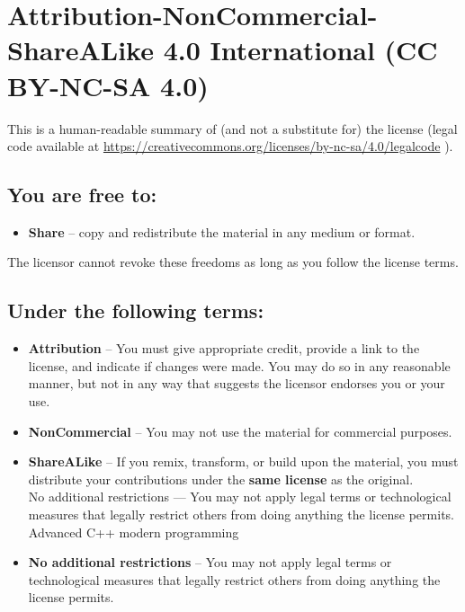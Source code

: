 \chapter*{Attribution-NonCommercial-ShareALike 4.0 International (CC BY-NC-SA 4.0)}

This is a human-readable summary of (and not a substitute for) the license
(legal code available at 
\url{https://creativecommons.org/licenses/by-nc-sa/4.0/legalcode}
).

\section*{You are free to:}

\begin{itemize}

\item \textbf{Share} --
copy and redistribute the material in any medium or format.

\end{itemize}

The licensor cannot revoke these freedoms as long as you follow the license terms.

\section*{Under the following terms:}

\begin{itemize}

\item \textbf{Attribution} --
You must give appropriate credit, provide a link to the license, and indicate
if changes were made. You may do so in any reasonable manner, but not in any
way that suggests the licensor endorses you or your use.

\item \textbf{NonCommercial} --
You may not use the material for commercial purposes.

\item \textbf{ShareALike} --
If you remix, transform, or build upon the material, 
you must distribute your contributions under the \textbf{same license}
 as the original.\\

No additional restrictions — You may not apply legal terms or technological measures that legally restrict others from doing anything the license permits. 
Advanced C++ modern programming

\item \textbf{No additional restrictions} --
You may not apply legal terms or technological measures that legally restrict
others from doing anything the license permits.

\end{itemize}
